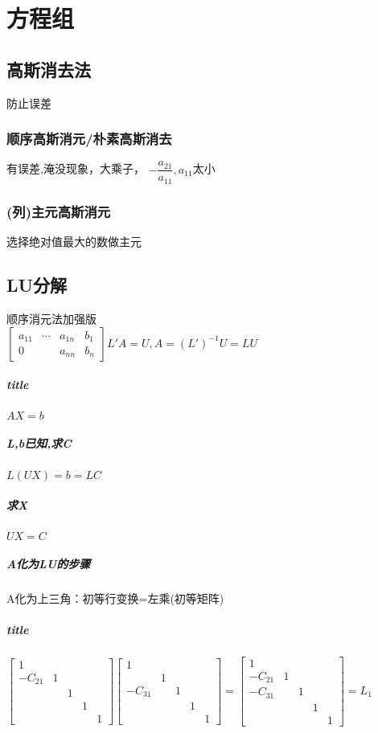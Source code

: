 \documentclass[UTF8,a4paper,12pt,scheme=chinese]{ctexbook}
\theoremstyle{plain}
\begin{document}
	\chapter{方程组}
	\section{高斯消去法}
	防止误差
	\subsection{顺序高斯消元/朴素高斯消去}
	有误差,淹没现象，大乘子，
	$ -\dfrac{a_{21}}{a_{11}},a_{11} $太小
	\subsection{(列)主元高斯消元}
	选择绝对值最大的数做主元
	\section{LU分解}
	顺序消元法加强版\\
	$ \left[\begin{array}{cccc}
	a_{11}&\cdots&a_{1n}&b_1\\
	0&&a_{nn}&b_n
	\end{array}\right] L'A=U,A=(L')^{-1}U=LU$
	\paragraph{title}$AX=b$
	\paragraph{L,b已知,求C}$L(UX)=b=LC$
	\paragraph{求X}$ UX=C $
	
	\paragraph{A化为LU的步骤}
	A化为上三角：初等行变换=左乘(初等矩阵)
	\paragraph{title}$ \left[\begin{array}{ccccc}
	1\\
	-C_{21}&1\\
	&&1\\
	&&&1\\
	&&&&1
	\end{array}\right]
	\left[\begin{array}{ccccc}
	1\\
	&1\\
	-C_{31}&&1\\
	&&&1\\
	&&&&1
	\end{array}\right]
	=
		\left[\begin{array}{ccccc}
	1\\
	-C_{21}&1\\
	-C_{31}&&1\\
	&&&1\\
	&&&&1
	\end{array}\right]
	=L_1
	 $
\end{document}
